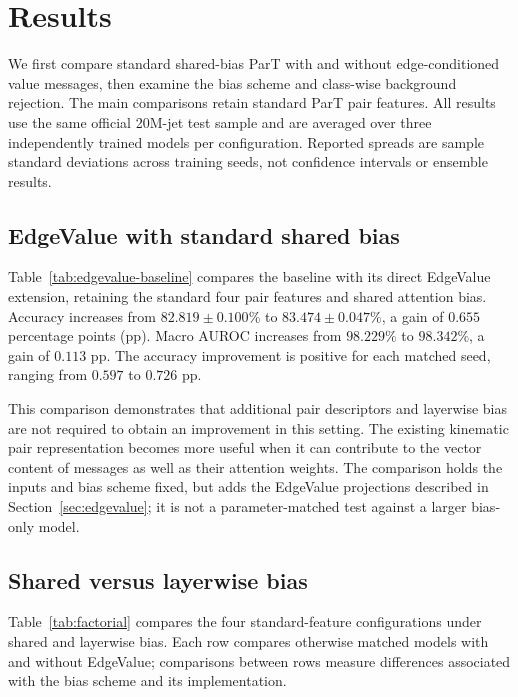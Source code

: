 \section{Results}
\label{sec:results}

We first compare standard shared-bias ParT with and without edge-conditioned
value messages, then examine the bias scheme and class-wise background
rejection. The main comparisons retain standard ParT pair features.
All results use the same official 20M-jet test sample and are averaged
over three independently trained models per configuration. Reported spreads
are sample standard deviations across training seeds, not confidence intervals
or ensemble results.

\subsection{EdgeValue with standard shared bias}
\label{sec:results-simple-ev}

Table~\ref{tab:edgevalue-baseline} compares the baseline with its direct
EdgeValue extension, retaining the standard four pair features and shared
attention bias. Accuracy increases from $82.819\pm0.100\%$ to
$83.474\pm0.047\%$, a gain of $0.655$ percentage points (pp).
Macro AUROC increases from $98.229\%$ to $98.342\%$, a gain of $0.113$ pp.
The accuracy improvement is positive for each matched seed, ranging from
$0.597$ to $0.726$ pp.



This comparison demonstrates that additional pair descriptors and layerwise
bias are not required to obtain an improvement in this setting. The existing
kinematic pair representation becomes more useful when it can contribute to
the vector content of messages as well as their attention weights. The
comparison holds the inputs and bias scheme fixed, but adds the EdgeValue
projections described in Section~\ref{sec:edgevalue}; it is not a
parameter-matched test against a larger bias-only model.

\subsection{Shared versus layerwise bias}
\label{sec:results-bias}

Table~\ref{tab:factorial} compares the four standard-feature configurations
under shared and layerwise bias. Each row compares otherwise matched models
with and without EdgeValue; comparisons between rows measure differences
associated with the bias scheme and its implementation.

